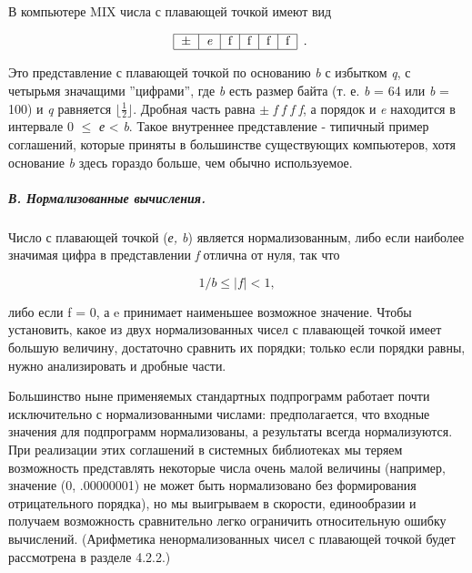 В компьютере MIX числа с плавающей точкой имеют вид

\begin{equation}\label{f1}
\begin{array}{c}
\text{\begin{tabular}{|l|l|l|l|l|l|}
\hline $\pm$ &\textit{e}&f&f&f&f\\\hline
\end{tabular}} 

\end{array}.
\end{equation}



Это представление с плавающей точкой по основанию \textit{b} с избытком \textit{q}, с четырьмя значащими ''цифрами'', где \textit{b} есть размер байта (т. е.  \textit{b} = 64 или \textit{b} = 100) и \textit{q} равняется $\lfloor \frac{1}{2} \rfloor $. Дробная часть равна $\pm$\textit{ f f f f}, а порядок и \textit{e} находится в интервале 0 $\leqslant$ \textit{е} < \textit{b}. Такое внутреннее представление - типичный пример соглашений, которые приняты в большинстве существующих компьютеров, хотя основание \textit{b} здесь гораздо больше, чем обычно используемое.

\subparagraph{В. Нормализованные вычисления.} Число с плавающей точкой (\textit{е, b}) является нормализованным, либо если наиболее значимая цифра в представлении \textit{f} отлична от нуля, так что

\begin{equation}
1/b \leqslant |f| < 1,
\end{equation}

либо если f = 0, а e принимает наименьшее возможное значение. Чтобы установить, какое из двух нормализованных чисел с плавающей точкой имеет большую величину, достаточно сравнить их порядки; только если порядки равны, нужно анализировать и дробные части.

Большинство ныне применяемых стандартных подпрограмм работает почти исключительно с нормализованными числами: предполагается, что входные значения для подпрограмм нормализованы, а результаты всегда нормализуются. При реализации этих соглашений в системных библиотеках мы теряем возможность представлять некоторые числа очень малой величины (например, значение (0, .00000001) не может быть нормализовано без формирования отрицательного порядка), но мы выигрываем в скорости, единообразии и получаем возможность сравнительно легко ограничить относительную ошибку вычислений. (Арифметика ненормализованных чисел с плавающей точкой будет рассмотрена в разделе 4.2.2.)

